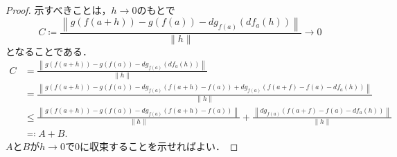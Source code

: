 \begin{proof}
示すべきことは，$h \to 0$のもとで
\begin{equation}
C \coloneqq \frac{\left\|g (f(a+h)) - g ( f(a) ) - dg_{f(a)}(df_a(h)) \right\|}{\|h\|} \to 0
\end{equation}となることである．
\begin{align}
C &=\frac{\left\|g (f(a+h)) - g ( f(a) ) - dg_{f(a)}(df_a(h)) \right\|}{\|h\|} \\
&= \frac{\left\|g (f(a+h)) - g ( f(a) ) - dg_{f(a)} (f(a+h) - f(a)) + dg_{f(a)}(f(a+f) - f(a) -df_a(h)) \right\|}{\|h\|} \\
& \leq \frac{\left\|g (f(a+h)) - g ( f(a) ) - dg_{f(a)} (f(a+h) - f(a))\right\|}{\|h\|} + \frac{\left\|dg_{f(a)}(f(a+f) - f(a) -df_a(h)) \right\|}{\|h\|} \\
& \eqqcolon A + B.
\end{align}$A$と$B$が$h \to 0$で0に収束することを示せればよい．


\end{proof}
